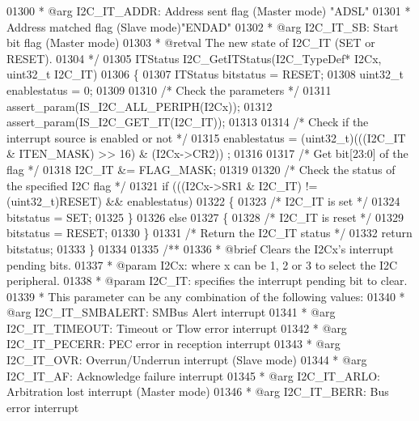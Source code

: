 \begin{DoxyCode}
01300 \textcolor{comment}{  *            @arg I2C\_IT\_ADDR: Address sent flag (Master mode) "ADSL"}
01301 \textcolor{comment}{  *                              Address matched flag (Slave mode)"ENDAD"}
01302 \textcolor{comment}{  *            @arg I2C\_IT\_SB: Start bit flag (Master mode)}
01303 \textcolor{comment}{  * @retval The new state of I2C\_IT (SET or RESET).}
01304 \textcolor{comment}{  */}
01305 ITStatus I2C_GetITStatus(I2C\_TypeDef* I2Cx, uint32\_t I2C\_IT)
01306 \{
01307   ITStatus bitstatus = RESET;
01308   uint32\_t enablestatus = 0;
01309 
01310   \textcolor{comment}{/* Check the parameters */}
01311   assert_param(IS\_I2C\_ALL\_PERIPH(I2Cx));
01312   assert_param(IS\_I2C\_GET\_IT(I2C\_IT));
01313 
01314   \textcolor{comment}{/* Check if the interrupt source is enabled or not */}
01315   enablestatus = (uint32\_t)(((I2C\_IT & ITEN_MASK) >> 16) & (I2Cx->CR2)) ;
01316 
01317   \textcolor{comment}{/* Get bit[23:0] of the flag */}
01318   I2C\_IT &= FLAG_MASK;
01319 
01320   \textcolor{comment}{/* Check the status of the specified I2C flag */}
01321   \textcolor{keywordflow}{if} (((I2Cx->SR1 & I2C\_IT) != (uint32\_t)RESET) && enablestatus)
01322   \{
01323     \textcolor{comment}{/* I2C\_IT is set */}
01324     bitstatus = SET;
01325   \}
01326   \textcolor{keywordflow}{else}
01327   \{
01328     \textcolor{comment}{/* I2C\_IT is reset */}
01329     bitstatus = RESET;
01330   \}
01331   \textcolor{comment}{/* Return the I2C\_IT status */}
01332   \textcolor{keywordflow}{return}  bitstatus;
01333 \}
01334 
01335 \textcolor{comment}{/**}
01336 \textcolor{comment}{  * @brief  Clears the I2Cx's interrupt pending bits.}
01337 \textcolor{comment}{  * @param  I2Cx: where x can be 1, 2 or 3 to select the I2C peripheral.}
01338 \textcolor{comment}{  * @param  I2C\_IT: specifies the interrupt pending bit to clear. }
01339 \textcolor{comment}{  *          This parameter can be any combination of the following values:}
01340 \textcolor{comment}{  *            @arg I2C\_IT\_SMBALERT: SMBus Alert interrupt}
01341 \textcolor{comment}{  *            @arg I2C\_IT\_TIMEOUT: Timeout or Tlow error interrupt}
01342 \textcolor{comment}{  *            @arg I2C\_IT\_PECERR: PEC error in reception  interrupt}
01343 \textcolor{comment}{  *            @arg I2C\_IT\_OVR: Overrun/Underrun interrupt (Slave mode)}
01344 \textcolor{comment}{  *            @arg I2C\_IT\_AF: Acknowledge failure interrupt}
01345 \textcolor{comment}{  *            @arg I2C\_IT\_ARLO: Arbitration lost interrupt (Master mode)}
01346 \textcolor{comment}{  *            @arg I2C\_IT\_BERR: Bus error interrupt}

\end{DoxyCode}
